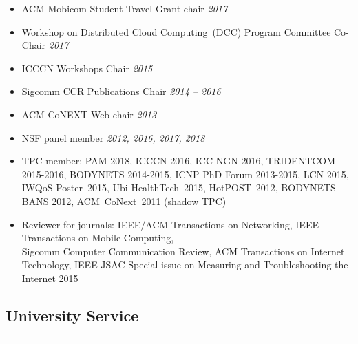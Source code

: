 \begin{itemize}

    \item ACM Mobicom Student Travel Grant chair \hfill{\it 2017}

    \item Workshop on Distributed Cloud Computing~(DCC) Program Committee
    Co-Chair \hfill{\it 2017}

    \item ICCCN Workshops Chair \hfill {\it 2015}

    \item Sigcomm CCR Publications Chair \hfill {\it 2014 -- 2016}

    \item ACM CoNEXT Web chair \hfill {\it 2013}


    \item NSF panel member \hfill {\it 2012, 2016, 2017, 2018}

    \item TPC member:
    PAM 2018,
    ICCCN 2016,
    ICC NGN 2016,
    TRIDENTCOM 2015-2016,
    BODYNETS 2014-2015,
    ICNP PhD Forum 2013-2015,
    LCN 2015,
    IWQoS Poster~2015,
    Ubi-HealthTech~2015,
    HotPOST~2012,
    BODYNETS BANS 2012,
    ACM~CoNext~2011 (shadow TPC)

    \item Reviewer for journals: IEEE/ACM Transactions on Networking, IEEE
    Transactions on Mobile Computing, \\
    Sigcomm Computer Communication Review,
    ACM Transactions on Internet Technology,
    IEEE JSAC Special issue on Measuring and Troubleshooting the Internet 2015

\end{itemize}

\subsection*{University Service}
\hrule
\vspace{0.2cm}

